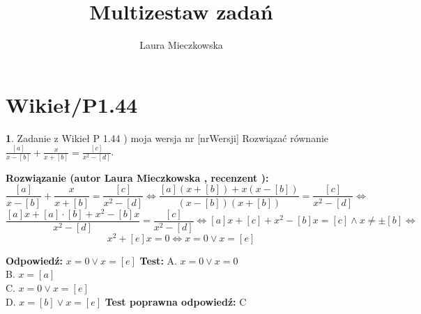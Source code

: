 \documentclass[12pt, a4paper]{article}
\title{Multizestaw zadań}
\author{Laura Mieczkowska}
\date{}
\theoremstyle{definition} %
\newtheorem{zad}{}
\newcommand{\kategoria}[1]{\section{#1}} %
\newcommand{\zadStart}[1]{\begin{zad}#1\newline} %
\newcommand{\zadStop}{\end{zad}}   %
\newcommand{\rozwStart}[2]{\noindent \textbf{Rozwiązanie (autor #1 , recenzent #2): }\newline} %
\newcommand{\odpStart}{\noindent \textbf{Odpowiedź:}\newline}    %
\newcommand{\odpStop}{\newline}                                             %
\newcommand{\testStart}{\noindent \textbf{Test:}\newline} %
\newcommand{\testStop}{\newline} %
\newcommand{\kluczStart}{\noindent \textbf{Test poprawna odpowiedź:}\newline} %
\newcommand{\kluczStop}{\newline} %
\begin{document}
\maketitle


\kategoria{Wikieł/P1.44}
\zadStart{Zadanie z Wikieł P 1.44 ) moja wersja nr [nrWersji]}
Rozwiązać równanie $\frac{[a]}{x-[b]}+\frac{x}{x+[b]}=\frac{[c]}{x^2-[d]}$.
\zadStop
\rozwStart{Laura Mieczkowska}{}
$$\frac{[a]}{x-[b]}+\frac{x}{x+[b]}=\frac{[c]}{x^2-[d]} \Leftrightarrow \frac{[a](x+[b])+x(x-[b])}{(x-[b])(x+[b])}=\frac{[c]}{x^2-[d]}\Leftrightarrow$$ 
$$ \frac{[a]x+[a]\cdot[b]+x^2-[b]x}{x^2-[d]}=\frac{[c]}{x^2-[d]} \Leftrightarrow [a]x+[c]+x^2-[b]x=[c] \wedge x\neq\pm[b]\Leftrightarrow$$
$$x^2+[e]x=0 \Leftrightarrow x=0 \vee x=[e]$$



\odpStart
$x=0 \vee x=[e]$
\odpStop
\testStart
A. $x=0 \vee x=0$ \\
B. $x=[a]$\\
C. $x=0 \vee x=[e]$ \\
D. $x=[b] \vee x=[e]$ 
\testStop
\kluczStart
C
\kluczStop
\end{document}
